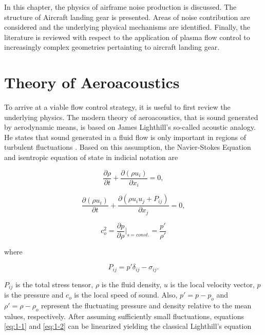 In this chapter, the physics of airframe noise production is discussed. The structure of Aircraft landing gear is presented. Areas of noise contribution are considered and the underlying physical mechanisms are identified. Finally, the literature is reviewed with respect to the application of plasma flow control to increasingly complex geometries pertainting to aircraft landing gear.

\section{Theory of Aeroacoustics}
To arrive at a viable flow control strategy, it is useful to first review the underlying physics.
The modern theory of aeroacoustics, that is sound generated by aerodynamic means, is based on James Lighthill's so-called acoustic analogy. He states that sound generated in a fluid flow is only important in regions of turbulent fluctuations \cite{howe2003}. Based on this assumption, the Navier-Stokes Equation and isentropic equation of state in indicial notation are

\begin{equation} \label{eq:1-1}
	\frac{\partial \rho}{\partial t} + \frac{\partial(\rho u_i)}{\partial x_i} = 0,
\end{equation}

\begin{equation} \label{eq:1-2}
\frac{\partial (\rho u_i)}{\partial t} + \frac{\partial(\rho u_i u_j + P_{ij})}{\partial x_j} = 0,
\end{equation}

\begin{equation} \label{eq:1-3}
	c_o^2 = \frac{\partial p}{\partial \rho}|_{s=const.} = \frac{p'}{\rho'}
\end{equation}

where 

\begin{equation} \label{eq:pij}
P_{ij} = p' \delta_{ij} - \sigma_{ij}.
\end{equation}

$P_{ij}$ is the total stress tensor, $\rho$ is the fluid density, $u$ is  the local velocity vector, $p$ is the pressure and $c_o$ is the local speed of sound. Also, $p' = p - p_o$ and $\rho' = \rho - \rho_o$ represent the fluctuating pressure and density relative to the mean values, respectively. After assuming sufficiently small fluctuations, equations \ref{eq:1-1} and \ref{eq:1-2} can be linearized yielding the classical Lighthill's equation

